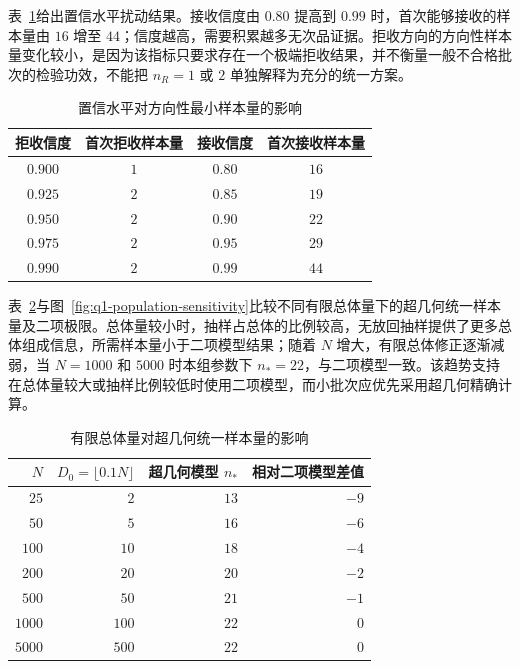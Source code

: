 表~\ref{tab:q1-confidence-sensitivity}给出置信水平扰动结果。接收信度由 $0.80$ 提高到 $0.99$ 时，首次能够接收的样本量由 $16$ 增至 $44$；信度越高，需要积累越多无次品证据。拒收方向的方向性样本量变化较小，是因为该指标只要求存在一个极端拒收结果，并不衡量一般不合格批次的检验功效，不能把 $n_R=1$ 或 $2$ 单独解释为充分的统一方案。

\begin{table}[H]
  \centering
  \caption{置信水平对方向性最小样本量的影响}
  \label{tab:q1-confidence-sensitivity}
  \begin{tabular}{cccc}
    \toprule
    拒收信度 & 首次拒收样本量 & 接收信度 & 首次接收样本量 \\
    \midrule
    $0.900$ & $1$ & $0.80$ & $16$ \\
    $0.925$ & $2$ & $0.85$ & $19$ \\
    $0.950$ & $2$ & $0.90$ & $22$ \\
    $0.975$ & $2$ & $0.95$ & $29$ \\
    $0.990$ & $2$ & $0.99$ & $44$ \\
    \bottomrule
  \end{tabular}
\end{table}

表~\ref{tab:q1-population-sensitivity}与图~\ref{fig:q1-population-sensitivity}比较不同有限总体量下的超几何统一样本量及二项极限。总体量较小时，抽样占总体的比例较高，无放回抽样提供了更多总体组成信息，所需样本量小于二项模型结果；随着 $N$ 增大，有限总体修正逐渐减弱，当 $N=1000$ 和 $5000$ 时本组参数下 $n_*=22$，与二项模型一致。该趋势支持在总体量较大或抽样比例较低时使用二项模型，而小批次应优先采用超几何精确计算。

\begin{table}[H]
  \centering
  \caption{有限总体量对超几何统一样本量的影响}
  \label{tab:q1-population-sensitivity}
  \begin{tabular}{rrrr}
    \toprule
    $N$ & $D_0=\lfloor0.1N\rfloor$ & 超几何模型 $n_*$ & 相对二项模型差值 \\
    \midrule
    $25$ & $2$ & $13$ & $-9$ \\
    $50$ & $5$ & $16$ & $-6$ \\
    $100$ & $10$ & $18$ & $-4$ \\
    $200$ & $20$ & $20$ & $-2$ \\
    $500$ & $50$ & $21$ & $-1$ \\
    $1000$ & $100$ & $22$ & $0$ \\
    $5000$ & $500$ & $22$ & $0$ \\
    \bottomrule
  \end{tabular}
\end{table}

